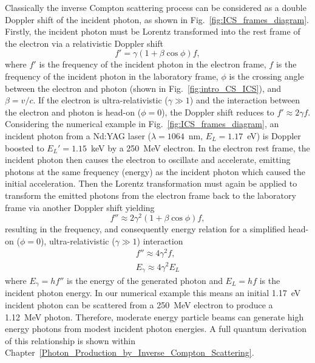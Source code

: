 \documentclass[../main.tex]{subfiles}
\begin{document}
Classically the inverse Compton scattering process can be considered as a double Doppler shift of the incident photon, as shown in Fig.~\ref{fig:ICS_frames_diagram}. Firstly, the incident photon must be Lorentz transformed into the rest frame of the electron via a relativistic Doppler shift
\begin{equation}
f'=\gamma\left(1+\beta\cos\phi\right)f,
\label{eq:Doppler_shift}    
\end{equation}
where $f'$ is the frequency of the incident photon in the electron frame, $f$ is the frequency of the incident photon in the laboratory frame, $\phi$ is the crossing angle between the electron and photon (shown in Fig.~\ref{fig:intro_CS_ICS}), and $\beta = v/c$. If the electron is ultra-relativistic ($\gamma \gg 1$) and the interaction between the electron and photon is head-on ($\phi=0$), the Doppler shift reduces to $f'\approx2\gamma f$. Considering the numerical example in Fig.~\ref{fig:ICS_frames_diagram}, an incident photon from a Nd:YAG laser ($\lambda = 1064$~\si{\nano\meter}, $E_{L} = 1.17$~\si{\electronvolt}) is Doppler boosted to $E_{L}' = 1.15$~\si{\kilo\electronvolt} by a 250~\si{\mega\electronvolt} electron. In the electron rest frame, the incident photon then causes the electron to oscillate and accelerate, emitting photons at the same frequency (energy) as the incident photon which caused the initial acceleration. Then the Lorentz transformation must again be applied to transform the emitted photons from the electron frame back to the laboratory frame via another Doppler shift yielding  
\begin{equation}
f'' \approx 2\gamma^{2}\left(1+\beta\cos\phi\right)f, 
\label{eq:2nd_Doppler_shift}    
\end{equation}
resulting in the frequency, and consequently energy relation for a simplified head-on ($\phi=0$), ultra-relativistic ($\gamma \gg 1$) interaction 
\begin{align}
f'' \approx 4\gamma^{2}f, \nonumber \\
E_{\gamma} \approx 4\gamma^{2}E_{L}
\end{align}
where $E_{\gamma} = hf''$ is the energy of the generated photon and $E_{L} = hf$ is the incident photon energy. In our numerical example this means an initial 1.17~\si{\electronvolt} incident photon can be scattered from a 250~\si{\mega\electronvolt} electron to produce a 1.12~\si{\mega\electronvolt} photon. Therefore, moderate energy particle beams can generate high energy photons from modest incident photon energies. A full quantum derivation of this relationship is shown within Chapter~\ref{Photon_Production_by_Inverse_Compton_Scattering}. 
 
\end{document}
